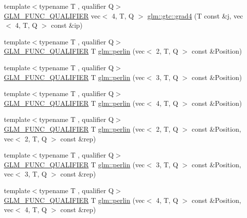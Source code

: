 \begin{DoxyCompactItemize}
\item 
{\footnotesize template$<$typename T , qualifier Q$>$ }\\\hyperlink{setup_8hpp_a33fdea6f91c5f834105f7415e2a64407}{G\+L\+M\+\_\+\+F\+U\+N\+C\+\_\+\+Q\+U\+A\+L\+I\+F\+I\+ER} vec$<$ 4, T, Q $>$ \hyperlink{namespaceglm_1_1gtc_a3e64854dc3369fadffdc335c55a90fd5}{glm\+::gtc\+::grad4} (T const \&j, vec$<$ 4, T, Q $>$ const \&ip)
\item 
{\footnotesize template$<$typename T , qualifier Q$>$ }\\\hyperlink{setup_8hpp_a33fdea6f91c5f834105f7415e2a64407}{G\+L\+M\+\_\+\+F\+U\+N\+C\+\_\+\+Q\+U\+A\+L\+I\+F\+I\+ER} T \hyperlink{namespaceglm_a54326f7a6c7c00d7702fe6f15fa0d13f}{glm\+::perlin} (vec$<$ 2, T, Q $>$ const \&Position)
\item 
{\footnotesize template$<$typename T , qualifier Q$>$ }\\\hyperlink{setup_8hpp_a33fdea6f91c5f834105f7415e2a64407}{G\+L\+M\+\_\+\+F\+U\+N\+C\+\_\+\+Q\+U\+A\+L\+I\+F\+I\+ER} T \hyperlink{namespaceglm_add5d8345389c307da58e6916d949c4be}{glm\+::perlin} (vec$<$ 3, T, Q $>$ const \&Position)
\item 
{\footnotesize template$<$typename T , qualifier Q$>$ }\\\hyperlink{setup_8hpp_a33fdea6f91c5f834105f7415e2a64407}{G\+L\+M\+\_\+\+F\+U\+N\+C\+\_\+\+Q\+U\+A\+L\+I\+F\+I\+ER} T \hyperlink{namespaceglm_ad9c74f290ab9071e4b3d158d62c7efdf}{glm\+::perlin} (vec$<$ 4, T, Q $>$ const \&Position)
\item 
{\footnotesize template$<$typename T , qualifier Q$>$ }\\\hyperlink{setup_8hpp_a33fdea6f91c5f834105f7415e2a64407}{G\+L\+M\+\_\+\+F\+U\+N\+C\+\_\+\+Q\+U\+A\+L\+I\+F\+I\+ER} T \hyperlink{namespaceglm_aa9d7537f6a631bed7dc89a866590c2b8}{glm\+::perlin} (vec$<$ 2, T, Q $>$ const \&Position, vec$<$ 2, T, Q $>$ const \&rep)
\item 
{\footnotesize template$<$typename T , qualifier Q$>$ }\\\hyperlink{setup_8hpp_a33fdea6f91c5f834105f7415e2a64407}{G\+L\+M\+\_\+\+F\+U\+N\+C\+\_\+\+Q\+U\+A\+L\+I\+F\+I\+ER} T \hyperlink{namespaceglm_aea1a673faff023ed76c5b8a54ee6b1c0}{glm\+::perlin} (vec$<$ 3, T, Q $>$ const \&Position, vec$<$ 3, T, Q $>$ const \&rep)
\item 
{\footnotesize template$<$typename T , qualifier Q$>$ }\\\hyperlink{setup_8hpp_a33fdea6f91c5f834105f7415e2a64407}{G\+L\+M\+\_\+\+F\+U\+N\+C\+\_\+\+Q\+U\+A\+L\+I\+F\+I\+ER} T \hyperlink{namespaceglm_a28583ae399b336a17defb061fba44ce5}{glm\+::perlin} (vec$<$ 4, T, Q $>$ const \&Position, vec$<$ 4, T, Q $>$ const \&rep)

\end{DoxyCompactItemize}
